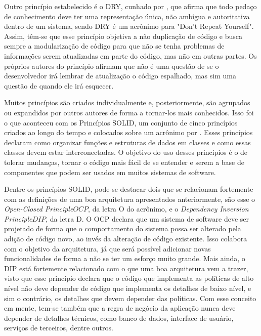 \documentclass[12pt, %
openright, 
oneside, %
a4paper,    %
brazil]{facom-ufu-abntex2}
\begin{document}
Outro princípio estabelecido é o DRY, cunhado por , que afirma que todo pedaço de conhecimento deve ter uma representação única, não ambígua e autoritativa dentro de um sistema, sendo DRY é um acrônimo para "Don't Repeat Yourself". Assim, têm-se que esse princípio objetiva a não duplicação de código e busca sempre a modularização de código para que não se tenha problemas de informações serem atualizadas em parte do código, mas não em outras partes. Os próprios autores do princípio afirmam que não é uma questão de se o desenvolvedor irá lembrar de atualização o código espalhado, mas sim uma questão de quando ele irá esquecer.

Muitos princípios são criados individualmente e, posteriormente, são agrupados ou expandidos por outros autores de forma a tornar-los mais conhecidos. Isso foi o que aconteceu com os Princípios SOLID, um conjunto de cinco princípios criados ao longo do tempo e colocados sobre um acrônimo por . Esses princípios declaram como organizar funções e estruturas de dados em classes e como essas classes devem estar interconectadas. O objetivo do uso desses princípios é o de tolerar mudanças, tornar o código mais fácil de se entender e serem a base de componentes que podem ser usados em muitos sistemas de software.

Dentre os princípios SOLID, pode-se destacar dois que se relacionam fortemente com as definições de uma boa arquitetura apresentados anteriormente, são esse o \textit{Open-Closed Principle\(OCP\)}, da letra O do acrônimo, e o \textit{Dependency Inversion Principle\(DIP\)}, da letra D. O OCP declara que um sistema de software deve ser projetado de forma que o comportamento do sistema possa ser alterado pela adição de código novo, ao invés da alteração de código existente. Isso colabora com o objetivo da arquitetura, já que será possível adicionar novas funcionalidades de forma a não se ter um esforço muito grande. Mais ainda, o DIP está fortemente relacionado com o que uma boa arquitetura vem a trazer, visto que esse princípio declara que o código que implementa as políticas de alto nível não deve depender de código que implementa os detalhes de baixo nível, e sim o contrário, os detalhes que devem depender das políticas. Com esse conceito em mente, tem-se também que a regra de negócio da aplicação nunca deve depender de detalhes técnicos, como banco de dados, interface de usuário, serviços de terceiros, dentre outros.
\end{document}
